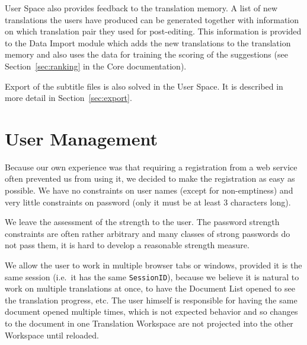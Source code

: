 User Space also provides feedback to the translation memory. A list of new translations the users have produced can be generated together with information on which translation pair they used for post-editing. This information is provided to the Data Import module which adds the new translations to the translation memory and also uses the data for training the scoring of the suggestions (see Section~\ref{sec:ranking} in the Core documentation).

Export of the subtitle files is also solved in the User Space. It is described in more detail in Section~\ref{sec:export}.

\section{User Management}
\label{us:usermanag}
Because our own experience was that requiring a registration from a web service often prevented us from using it, we decided to make the registration as easy as possible. We have no constraints on user names (except for non-emptiness) and very little constraints on password (only it must be at least 3 characters long).


We leave the assessment of the strength to the user. The password strength constraints are often rather arbitrary and many classes of strong passwords do not pass them, it is hard to develop a reasonable strength measure. 



We allow the user to work in multiple browser tabs or windows, provided it is the same session (i.e.\ it has the same {\tt SessionID}), because we believe it is natural to work on multiple translations at once, to have the Document List opened to see the translation progress, etc. The user himself is responsible for having the same document opened multiple times, which is not expected behavior and so changes to the document in one Translation Workspace are not projected into the other Workspace until reloaded.

